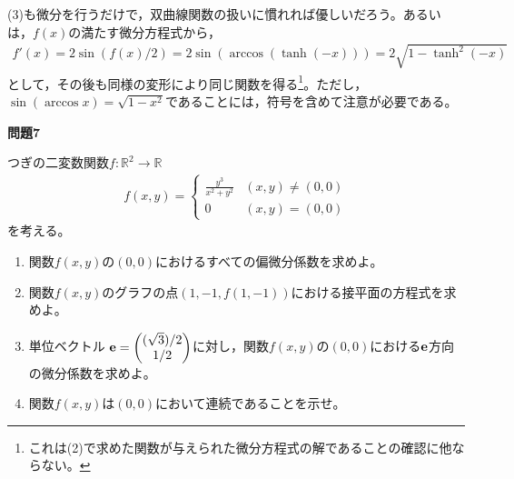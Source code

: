 \documentclass[a4paper,12pt,dvipdfmx,fleqn, oneside]{jsarticle}
\theoremstyle{defstyle}
\theoremstyle{thmx}
\theoremstyle{qesstyle}
\begin{document}
(3)も微分を行うだけで，双曲線関数の扱いに慣れれば優しいだろう。あるいは，$f(x)$の満たす微分方程式から，
\begin{align*}
    f'(x) = 2\sin (f(x)/2)= 2 \sin (\arccos (\tanh (-x))) = 2 \sqrt{1- \tanh^2(-x)}
\end{align*}
として，その後も同様の変形により同じ関数を得る\footnote{これは(2)で求めた関数が与えられた微分方程式の解であることの確認に他ならない。}。ただし，$\sin (\arccos x) = \sqrt{1-x^2}$であることには，符号を含めて注意が必要である。
\begin{shadebox}
    \textbf{問題7}

    つぎの二変数関数$f: \mathbb{R}^2 \rightarrow \mathbb{R}$
    \begin{align*}
        f(x,y) =
        \begin{cases}
            \frac{y^3}{x^2+y^2} & (x,y) \neq (0,0) \\
            0                   & (x,y)= (0,0)
        \end{cases}
    \end{align*}
    を考える。
    \begin{enumerate}
        \item 関数$f(x,y)$の$(0,0)$におけるすべての偏微分係数を求めよ。
        \item 関数$f(x,y)$のグラフの点$(1,-1,f(1,-1))$における接平面の方程式を求めよ。
        \item 単位ベクトル $\bf{e}=
                  \begin{pmatrix}
                      (\sqrt{3})/2 \\
                      1/2
                  \end{pmatrix}$に対し，関数$f(x,y)$の$(0,0)$における$\bf{e}$方向の微分係数を求めよ。
        \item 関数$f(x,y)$は$(0,0)$において連続であることを示せ。
    \end{enumerate}
\end{shadebox}
\end{document}
